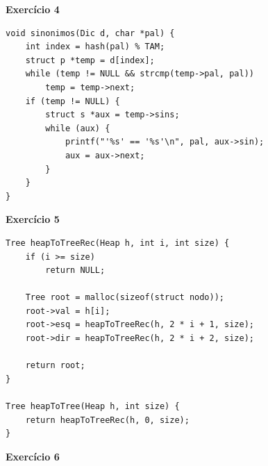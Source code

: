 \documentclass[a4paper,11pt]{article}
\begin{document}
\noindent \textbf{Exercício 4}

\begin{verbatim}
void sinonimos(Dic d, char *pal) {
	int index = hash(pal) % TAM;
	struct p *temp = d[index];
	while (temp != NULL && strcmp(temp->pal, pal))
		temp = temp->next;
	if (temp != NULL) {
		struct s *aux = temp->sins;
		while (aux) {
			printf("'%s' == '%s'\n", pal, aux->sin);
			aux = aux->next;
		}
	}
}
\end{verbatim}

\noindent \textbf{Exercício 5}

\begin{verbatim}
Tree heapToTreeRec(Heap h, int i, int size) {
	if (i >= size)
		return NULL;
	
	Tree root = malloc(sizeof(struct nodo));
	root->val = h[i];
	root->esq = heapToTreeRec(h, 2 * i + 1, size);
	root->dir = heapToTreeRec(h, 2 * i + 2, size);
	
	return root;
}
	
Tree heapToTree(Heap h, int size) {
	return heapToTreeRec(h, 0, size);
}
\end{verbatim}

\noindent \textbf{Exercício 6}
\end{document}
